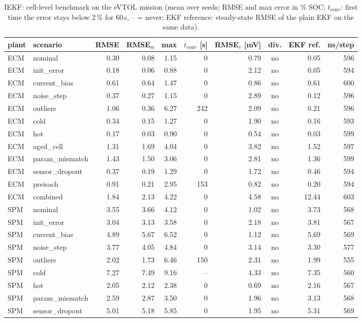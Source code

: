 \begin{table}[H]\centering\footnotesize\setlength{\tabcolsep}{4pt}
\caption{IEKF: cell-level benchmark on the eVTOL mission (mean over seeds; RMSE and max error in \% SOC; $t_\mathrm{conv}$: first time the error stays below 2\,\% for 60\,s, -- = never; EKF reference: steady-state RMSE of the plain EKF on the same data).}\label{tab:cell_IEKF}
\begin{tabular}{llrrrrrcrr}\toprule
plant & scenario & RMSE & RMSE$_\mathrm{ss}$ & max & $t_\mathrm{conv}$ [s] & RMSE$_v$ [mV] & div. & EKF ref. & ns/step \\ \midrule
ECM & nominal & 0.30 & 0.08 & 1.15 & 0 & 0.79 & no & 0.05 & 596 \\
ECM & init\_error & 0.18 & 0.06 & 0.88 & 0 & 2.12 & no & 0.05 & 594 \\
ECM & current\_bias & 0.61 & 0.64 & 1.47 & 0 & 0.86 & no & 0.61 & 600 \\
ECM & noise\_step & 0.37 & 0.27 & 1.15 & 0 & 2.89 & no & 0.12 & 596 \\
ECM & outliers & 1.06 & 0.36 & 6.27 & 242 & 2.09 & no & 0.21 & 596 \\
ECM & cold & 0.34 & 0.15 & 1.27 & 0 & 1.90 & no & 0.16 & 593 \\
ECM & hot & 0.17 & 0.03 & 0.90 & 0 & 0.54 & no & 0.03 & 599 \\
ECM & aged\_cell & 1.31 & 1.69 & 4.04 & 0 & 3.82 & no & 1.52 & 597 \\
ECM & param\_mismatch & 1.43 & 1.50 & 3.06 & 0 & 2.81 & no & 1.36 & 599 \\
ECM & sensor\_dropout & 0.37 & 0.19 & 1.29 & 0 & 1.72 & no & 0.46 & 594 \\
ECM & preisach & 0.91 & 0.21 & 2.95 & 153 & 0.82 & no & 0.20 & 594 \\
ECM & combined & 1.84 & 2.13 & 4.22 & 0 & 4.58 & no & 12.44 & 603 \\
\midrule
SPM & nominal & 3.55 & 3.66 & 4.12 & 0 & 1.02 & no & 3.73 & 568 \\
SPM & init\_error & 3.04 & 3.13 & 3.58 & 0 & 2.18 & no & 3.81 & 567 \\
SPM & current\_bias & 4.89 & 5.67 & 6.52 & 0 & 1.12 & no & 5.69 & 569 \\
SPM & noise\_step & 3.77 & 4.05 & 4.84 & 0 & 3.14 & no & 3.30 & 577 \\
SPM & outliers & 2.02 & 1.73 & 6.46 & 150 & 2.31 & no & 1.99 & 555 \\
SPM & cold & 7.27 & 7.49 & 9.16 & -- & 4.33 & no & 7.35 & 560 \\
SPM & hot & 2.05 & 2.12 & 2.38 & 0 & 0.69 & no & 2.16 & 567 \\
SPM & param\_mismatch & 2.59 & 2.87 & 3.50 & 0 & 1.96 & no & 3.13 & 568 \\
SPM & sensor\_dropout & 5.01 & 5.18 & 5.85 & 0 & 1.95 & no & 5.31 & 569 \\
\bottomrule\end{tabular}\end{table}
